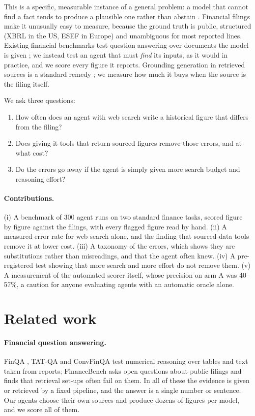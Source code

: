 \documentclass[10pt,a4paper]{article}
\begin{document}
This is a specific, measurable instance of a general problem: a model that cannot find a fact tends to produce a
plausible one rather than abstain \citep{ji2023,kalai2025}. Financial filings make it unusually easy to measure,
because the ground truth is public, structured (XBRL in the US, ESEF in Europe) and unambiguous for most reported
lines. Existing financial benchmarks test question answering over documents the model is given
\citep{chen2021finqa,islam2023financebench}; we instead test an agent that must \emph{find} its inputs, as it would
in practice, and we score every figure it reports. Grounding generation in retrieved sources is a standard remedy
\citep{lewis2020}; we measure how much it buys when the source is the filing itself.

We ask three questions:
\begin{enumerate}
  \item How often does an agent with web search write a historical figure that differs from the filing?
  \item Does giving it tools that return sourced figures remove those errors, and at what cost?
  \item Do the errors go away if the agent is simply given more search budget and reasoning effort?
\end{enumerate}

\paragraph{Contributions.} (i) A benchmark of 300 agent runs on two standard finance tasks, scored figure by figure
against the filings, with every flagged figure read by hand. (ii) A measured error rate for web search alone, and the
finding that sourced-data tools remove it at lower cost. (iii) A taxonomy of the errors, which shows they are
substitutions rather than misreadings, and that the agent often knew. (iv) A pre-registered test showing that more
search and more effort do not remove them. (v) A measurement of the automated scorer itself, whose precision on
arm A was 40--57\%, a caution for anyone evaluating agents with an automatic oracle alone.

\section{Related work}

\paragraph{Financial question answering.} FinQA \citep{chen2021finqa}, TAT-QA \citep{zhu2021tatqa} and ConvFinQA
\citep{chen2022convfinqa} test numerical reasoning over tables and text taken from reports; FinanceBench
\citep{islam2023financebench} asks open questions about public filings and finds that retrieval set-ups often fail
on them. In all of these the evidence is given or retrieved by a fixed pipeline, and the answer is a single number or
sentence. Our agents choose their own sources and produce dozens of figures per model, and we score all of them.
\end{document}
